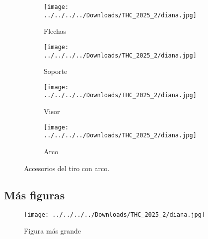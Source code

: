 \documentclass[12pt, legalpaper]{article}
\begin{document}
\begin{figure}[H] %
    \begin{subfigure}{0.45\textwidth}
        \centering
        \texttt{[image: ../../../../Downloads/THC\_2025\_2/diana.jpg]} 
        \caption{Flechas}
        \label{a}
    \end{subfigure}
    \begin{subfigure}{0.45\textwidth}
        \centering
        \texttt{[image: ../../../../Downloads/THC\_2025\_2/diana.jpg]} 
        \caption{Soporte}
        \label{b}
    \end{subfigure} 
    
    \begin{subfigure}{0.45\textwidth} %
        \centering
        \texttt{[image: ../../../../Downloads/THC\_2025\_2/diana.jpg]} 
        \caption{Visor}
        \label{c}
    \end{subfigure}
    \begin{subfigure}{0.45\textwidth}
        \centering
        \texttt{[image: ../../../../Downloads/THC\_2025\_2/diana.jpg]} 
        \caption{Arco}
        \label{c}
    \end{subfigure}
    \caption{Accesorios del tiro con arco.}
\end{figure}

\subsection{Más figuras}

\newpage

\begin{landscape}
    \begin{figure}[H]
        \centering
        \texttt{[image: ../../../../Downloads/THC\_2025\_2/diana.jpg]} 
        \caption{Figura más grande}
        \label{fig:enter-label}
    \end{figure}
\end{landscape}
\end{document}

